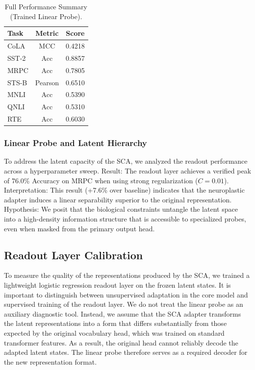 \documentclass[11pt, letterpaper]{article}
\begin{document}
\begin{table}[htbp]
    \centering
    \caption{Full Performance Summary (Trained Linear Probe).}
    \label{tab:linear_probe}
    \begin{tabular}{@{} l c c @{}}
        \toprule
        \textbf{Task} & \textbf{Metric} & \textbf{Score} \\
        \midrule
        CoLA  & MCC     & 0.4218 \\
        SST-2 & Acc     & 0.8857 \\
        MRPC  & Acc     & 0.7805 \\
        STS-B & Pearson & 0.6510 \\
        MNLI  & Acc     & 0.5390 \\
        QNLI  & Acc     & 0.5310 \\
        RTE   & Acc     & 0.6030 \\
        \bottomrule
    \end{tabular}
\end{table}
 
 \subsubsection{Linear Probe and Latent Hierarchy}
To address the latent capacity of the SCA, we analyzed the readout performance across a hyperparameter sweep. Result: The readout layer achieves a verified peak of 76.0\% Accuracy on MRPC when using strong regularization ($C=0.01$). Interpretation: This result (+7.6\% over baseline) indicates that the neuroplastic adapter induces a linear separability superior to the original representation. Hypothesis: We posit that the biological constraints untangle the latent space into a high-density information structure that is accessible to specialized probes, even when masked from the primary output head.

\subsection{Readout Layer Calibration}
To measure the quality of the representations produced by the SCA, we trained a lightweight logistic regression readout layer on the frozen latent states. It is important to distinguish between unsupervised adaptation in the core model and supervised training of the readout layer.
We do not treat the linear probe as an auxiliary diagnostic tool. Instead, we assume that the SCA adapter transforms the latent representations into a form that differs substantially from those expected by the original vocabulary head, which was trained on standard transformer features. As a result, the original head cannot reliably decode the adapted latent states. The linear probe therefore serves as a required decoder for the new representation format.
\end{document}
